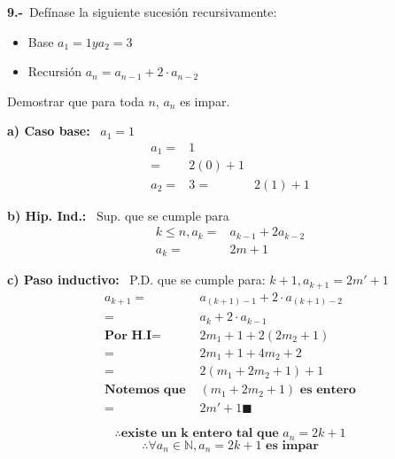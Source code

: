 \textbf{9.-}\ Defínase la siguiente sucesión recursivamente:
\begin{itemize}
    \setlength{\itemindent}{5em} 
    \item Base $a_1 = 1 y a_2 = 3$
    \item Recursión $a_n=a_{n-1}+2\cdot a_{n-2}$
\end{itemize}
Demostrar que para toda $n$, $a_n$ es impar.

\textbf{a) Caso base: }\ $a_1=1$
\begin{align*}
    a_1=&1\\
          =&2(0)+1\\
    a_2=&3=&2(1)+1
\end{align*}

\textbf{b) Hip. Ind.: }\ Sup. que se cumple para
\begin{align*}
    k\leq n,a_k=&a_{k-1}+2a_{k-2}\\
    a_k =&2m+1
\end{align*}

\textbf{c) Paso inductivo: }\ P.D. que se cumple para: $k+1,a_{k+1} =2m'+1$
\begin{align*}
    a_{k+1}=&a_{(k+1)-1}+2\cdot a_{(k+1)-2}\\
            =&a_k + 2\cdot a_{k-1}\\
    \textbf{Por H.I}=&2m_1 +1 +2(2m_2 +1)\\
                   =&2m_1 +1 +4m_2 +2\\
                    =&2(m_1 + 2m_2 +1) +1\\
\textbf{Notemos que }&(m_1 + 2m_2 +1)\textbf{ es entero}\\
      =&2m'+1\blacksquare
\end{align*}

$$\therefore \textbf{existe un k entero tal que } a_n=2k+1$$
$$\therefore \forall a_n\in \mathbb{N}, a_n=2k+1 \textbf{ es impar}$$